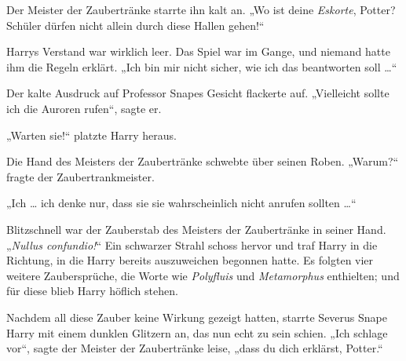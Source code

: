 Der Meister der Zaubertränke starrte ihn kalt an.
„Wo ist deine \emph{Eskorte}, Potter? Schüler dürfen nicht allein durch diese Hallen gehen!“

Harrys Verstand war wirklich leer. Das Spiel war im Gange, und niemand hatte ihm die Regeln erklärt.
„Ich bin mir nicht sicher, wie ich das beantworten soll …“

Der kalte Ausdruck auf Professor Snapes Gesicht flackerte auf.
„Vielleicht sollte ich die Auroren rufen“, sagte er.

„Warten sie!“ platzte Harry heraus.

Die Hand des Meisters der Zaubertränke schwebte über seinen Roben.
„Warum?“ fragte der Zaubertrankmeister.

„Ich … ich denke nur, dass sie sie wahrscheinlich nicht anrufen sollten …“

Blitzschnell war der Zauberstab des Meisters der Zaubertränke in seiner Hand.
„\emph{Nullus confundio!}“
Ein schwarzer Strahl schoss hervor und traf Harry in die Richtung, in die Harry bereits auszuweichen begonnen hatte. Es folgten vier weitere Zaubersprüche, die Worte wie \emph{Polyfluis} und \emph{Metamorphus} enthielten; und für diese blieb Harry höflich stehen.

Nachdem all diese Zauber keine Wirkung gezeigt hatten, starrte Severus Snape Harry mit einem dunklen Glitzern an, das nun echt zu sein schien.
„Ich schlage vor“, sagte der Meister der Zaubertränke leise, „dass du dich erklärst, Potter.“


